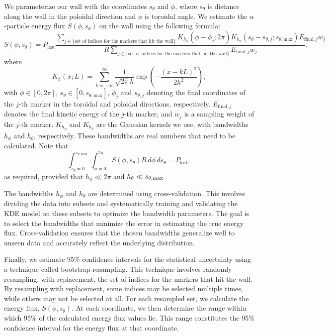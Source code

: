\documentclass[10pt, a4paper, twoside]{article}
\begin{document}
We parameterize our wall with the coordinates \(s_\theta\) and \(\phi\), where \(s_\theta\) is distance along the wall in the poloidal direction and \(\phi\) is toroidal angle. We estimate the $\alpha$-particle energy flux \(S(\phi, s_\theta)\) on the wall using the following formula:
\begin{equation}
  S(\phi, s_\theta) = P_{\text{lost}}\frac{\sum_{j \in \{\text{set of indices for the markers that hit the wall}\}} K_{h_{\phi}}(\phi - \phi_j; 2\pi) K_{h_{\theta}}(s_\theta - s_{\theta,j}; s_{\theta, \text{max}}) E_{\text{final}, j} w_j}{R \sum_{j \in \{\text{set of indices for the markers that hit the wall}\}} E_{\text{final}, j} w_j},  
\end{equation}
where
\begin{equation}
 K_h(x; L) = \sum_{k=-\infty}^\infty \frac{1}{\sqrt{2\pi} h} \exp\left(-\frac{(x - kL)^2}{2h^2}\right),   
\end{equation}
with \(\phi \in [0, 2\pi]\), \(s_\theta \in [0, s_{\theta, \text{max}}]\), \(\phi_j\) and \(s_{\theta,j}\) denoting the final coordinates of the \(j\)-th marker in the toroidal and poloidal directions, respectively. \(E_{\text{final}, j}\) denotes the final kinetic energy of the \(j\)-th marker, and \(w_j\) is a sampling weight of the \(j\)-th marker. \(K_{h_{\phi}}\) and \(K_{h_{\theta}}\) are the Gaussian kernels we use, with bandwidths \(h_{\phi}\) and \(h_{\theta}\), respectively. These bandwidths are real numbers that need to be calculated.
Note that
\begin{equation}
\int_{s_\theta=0}^{s_{\theta,\text{max}}}\int_{\phi=0}^{2\pi} S(\phi, s_\theta) R \, d\phi \, ds_\theta = P_{\text{lost}},
\end{equation}
as required, provided that $h_{\phi} \ll 2\pi$ and $h_{\theta} \ll s_{\theta,{\rm max}}$.

The bandwidths \(h_{\phi}\) and \(h_{\theta}\) are determined using cross-validation. This involves dividing the data into subsets and systematically training and validating the KDE model on these subsets to optimize the bandwidth parameters. The goal is to select the bandwidths that minimize the error in estimating the true energy flux. Cross-validation ensures that the chosen bandwidths generalize well to unseen data and accurately reflect the underlying distribution.

Finally, we estimate 95\% confidence intervals for the statistical uncertainty using a technique called bootstrap resampling. This technique involves randomly resampling, with replacement, the set of indices for the markers that hit the wall. By resampling with replacement, some indices may be selected multiple times, while others may not be selected at all. For each resampled set, we calculate the energy flux, \(S(\phi, s_\theta)\). At each coordinate, we then determine the range within which 95\% of the calculated energy flux values lie. This range constitutes the 95\% confidence interval for the energy flux at that coordinate.
\end{document}
